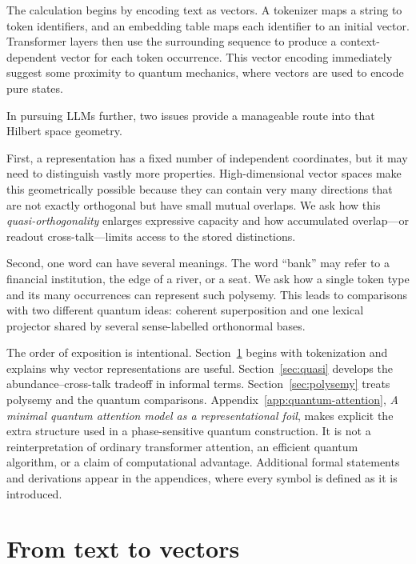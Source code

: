 \documentclass[
  aps,
  reprint,
  superscriptaddress,
  floatfix,
  nofootinbib,
  longbibliography
]{revtex4-2}
\begin{document}
The calculation begins by encoding text as vectors.  A tokenizer maps a
string to token identifiers, and an embedding table maps each identifier to an
initial vector.  Transformer layers then use the surrounding sequence to
produce a context-dependent vector for each token occurrence.
This vector encoding immediately suggest some proximity to quantum mechanics, where vectors are used to encode pure states.

In pursuing LLMs further, two issues provide a manageable route into that Hilbert space geometry.

First, a representation has a fixed number of independent coordinates, but it
may need to distinguish vastly more properties.  High-dimensional vector
spaces make this geometrically possible because they can contain very many directions that
are not exactly orthogonal but have small mutual overlaps.  We ask how this
\emph{quasi-orthogonality} enlarges expressive capacity and how accumulated
overlap---or readout cross-talk---limits access to the stored distinctions.

Second, one word can have several meanings.  The word ``bank'' may refer to a
financial institution, the edge of a river, or a seat.  We ask how a single
token type and its many occurrences can represent such polysemy.  This leads
to comparisons with two different quantum ideas: coherent superposition and
one lexical projector shared by several sense-labelled orthonormal bases.

The order of exposition is intentional.  Section~\ref{sec:vectors} begins
with tokenization and explains why vector representations are useful.
Section~\ref{sec:quasi} develops the abundance--cross-talk tradeoff in
informal terms.  Section~\ref{sec:polysemy} treats polysemy and the quantum
comparisons.  Appendix~\ref{app:quantum-attention}, \emph{A minimal quantum
attention model as a representational foil}, makes explicit the extra
structure used in a phase-sensitive quantum construction.  It is not a
reinterpretation of ordinary transformer attention, an efficient quantum
algorithm, or a claim of computational advantage.  Additional formal
statements and derivations appear in the
appendices, where every symbol is defined as it is introduced.

\section{From text to vectors}
\label{sec:vectors}
\end{document}
